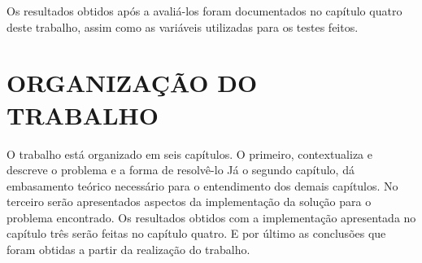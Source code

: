 Os resultados obtidos após a avaliá-los foram documentados no capítulo quatro
deste trabalho, assim como as variáveis utilizadas para os testes feitos.

\section{ORGANIZAÇÃO DO TRABALHO}
\label{sec:organizacaoTrabalho}

O trabalho está organizado em seis capítulos. O primeiro, contextualiza e descreve o problema e a forma de resolvê-lo
Já o segundo capítulo, dá embasamento teórico necessário para o entendimento dos demais capítulos.
No terceiro serão apresentados aspectos da implementação da solução para o problema encontrado. 
Os resultados obtidos com a implementação apresentada no capítulo três serão feitas no capítulo quatro. 
E por último as conclusões que foram obtidas a partir da realização do trabalho.
